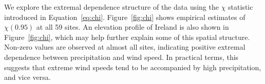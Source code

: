 \documentclass[12pt,compact]{article}
\begin{document}

We explore the extremal dependence structure of the data using the $\chi$ statistic introduced in Equation~\eqref{eq:chi}.
Figure~\ref{fig:chi} shows empirical estimates of $\chi(0.95)$ at all 59 sites.
An elevation profile of Ireland is also shown in Figure~\ref{fig:chi}, which may help further explain some of this spatial structure.
Non-zero values are observed at almost all sites, indicating positive extremal dependence between precipitation and wind speed. 
In practical terms, this suggests that extreme wind speeds tend to be accompanied by high precipitation, and vice versa. 
\end{document}

